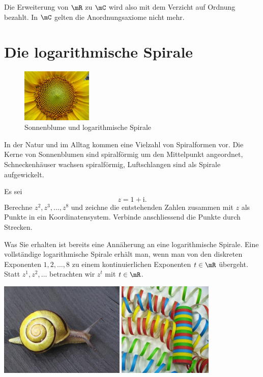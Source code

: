 \documentclass[%
11pt,%
twoside,%
titlepage,%
german,%
headsepline%
]{scrartcl}
\begin{document}
Die Erweiterung von $\mR$ zu $\mC$ wird also mit dem Verzicht auf Ordnung bezahlt. In $\mC$ gelten die Anordnungsaxiome nicht mehr.

\section{Die logarithmische Spirale}
\begin{figure}
\begin{center}
\includegraphics[width=0.3\textwidth]{pictures/sonnenblume}
\end{center}
\caption{Sonnenblume und logarithmische Spirale}
\end{figure}
In der Natur und im Alltag kommen eine Vielzahl von Spiralformen vor. Die Kerne von Sonnenblumen sind spiralf\"ormig um den Mittelpunkt angeordnet, Schneckenhäuser wachsen spiralf\"ormig, Luftschlangen sind als Spirale aufgewickelt.
\begin{ueb}[Spiral]
Es sei
$$z=1+\mathrm{i}.$$
Berechne $z^2,z^3,\dots,z^8$ und zeichne die entstehenden Zahlen zusammen mit $z$ als Punkte in ein Koordinatensystem. Verbinde anschliessend die Punkte durch Strecken.
\end{ueb}
\noindent Was Sie erhalten ist bereits eine Annäherung an eine logarithmische Spirale. Eine vollständige logarithmische Spirale erhält man, wenn man von den diskreten Exponenten $1, 2,\dots, 8$ zu einem kontinuierlichen Exponenten $t \in \mR$ \"ubergeht. Statt $z^1,z^2,\dots$ betrachten wir $z^t$ mit $t\in\mR$.

\begin{center}
\includegraphics[width=0.45\textwidth]{pictures/schneckenhaus}
\includegraphics[width=0.338\textwidth]{pictures/luftschlange}
\end{center}
\end{document}

